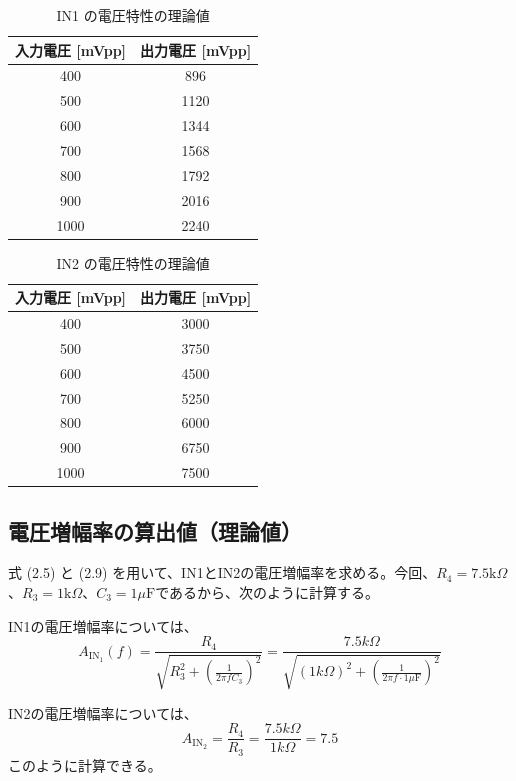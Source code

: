 \documentclass{jlreq}
\numberwithin{equation}{section}
\begin{document}
\begin{table}[H]
  \centering
  \caption{IN1 の電圧特性の理論値}
  \begin{tabular}{|c|c|}
    \hline
    入力電圧 [mVpp] & 出力電圧 [mVpp] \\ \hline
    400 & 896 \\ \hline
    500 & 1120 \\ \hline
    600 & 1344 \\ \hline
    700 & 1568 \\ \hline
    800 & 1792 \\ \hline
    900 & 2016 \\ \hline
    1000 & 2240 \\ \hline
  \end{tabular}
\end{table}

\begin{table}[H]
  \centering
  \caption{IN2 の電圧特性の理論値}
  \begin{tabular}{|c|c|}
    \hline
    入力電圧 [mVpp] & 出力電圧 [mVpp] \\ \hline
    400 & 3000 \\ \hline
    500 & 3750 \\ \hline
    600 & 4500 \\ \hline
    700 & 5250 \\ \hline
    800 & 6000 \\ \hline
    900 & 6750 \\ \hline
    1000 & 7500 \\ \hline
  \end{tabular}
\end{table}

\subsection{電圧増幅率の算出値（理論値）}
式 (2.5) と (2.9) を用いて、IN1とIN2の電圧増幅率を求める。今回、\(R_4 = 7.5\text{k}\Omega\)、\(R_3 = 1\text{k}\Omega\)、\(C_3 = 1\mu\text{F}\)であるから、次のように計算する。

IN1の電圧増幅率については、
\begin{equation}
  A_{\text{IN}_1}(f) = \frac{R_4}{\sqrt{R_3^2 + \left(\frac{1}{2\pi f C_3}\right)^2}} = \frac{7.5k\Omega}{\sqrt{(1k\Omega)^2 + \left(\frac{1}{2\pi f \cdot 1\mu\text{F}}\right)^2}}
\end{equation}

IN2の電圧増幅率については、
\begin{equation}
  A_{\text{IN}_2} = \frac{R_4}{R_3} = \frac{7.5k\Omega}{1k\Omega} = 7.5
\end{equation}
このように計算できる。
\end{document}

